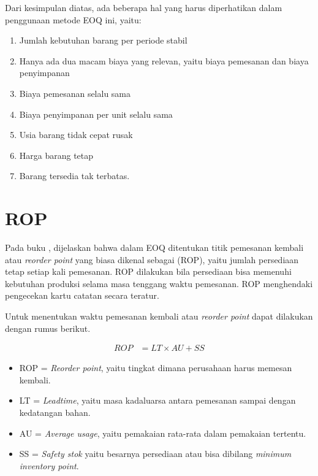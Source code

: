 Dari kesimpulan diatas, ada beberapa hal yang harus diperhatikan dalam penggunaan metode EOQ ini, yaitu:

\begin{enumerate}
	\item Jumlah kebutuhan barang per periode stabil
	\item Hanya ada dua macam biaya yang relevan, yaitu biaya pemesanan dan biaya penyimpanan
	\item Biaya pemesanan selalu sama
	\item Biaya penyimpanan per unit selalu sama
	\item Usia barang tidak cepat rusak
	\item Harga barang tetap
	\item Barang tersedia tak terbatas.
\end{enumerate}

\section{ROP}

Pada buku \citep{pengendalianpersediaan}, dijelaskan bahwa dalam EOQ ditentukan titik pemesanan kembali atau \textit{reorder point} yang biasa dikenal sebagai (ROP), yaitu jumlah persediaan tetap setiap kali pemesanan. ROP dilakukan bila persediaan bisa memenuhi kebutuhan produksi selama masa tenggang waktu pemesanan. ROP menghendaki pengecekan kartu catatan secara teratur.

Untuk menentukan waktu pemesanan kembali atau \textit{reorder point} dapat dilakukan dengan rumus berikut.

\begin{equation}
    \begin{split}
		ROP
		&= LT \times AU + SS
    \end{split}
\end{equation}

\begin{itemize}
	\item ROP = \textit{Reorder point}, yaitu tingkat dimana perusahaan harus memesan kembali. 
	\item LT = \textit{Leadtime}, yaitu masa kadaluarsa antara pemesanan sampai dengan kedatangan bahan.
	\item AU = \textit{Average usage}, yaitu pemakaian rata-rata dalam pemakaian tertentu.
	\item SS = \textit{Safety stok} yaitu besarnya persediaan atau bisa dibilang \textit{minimum inventory point}.
\end{itemize}

